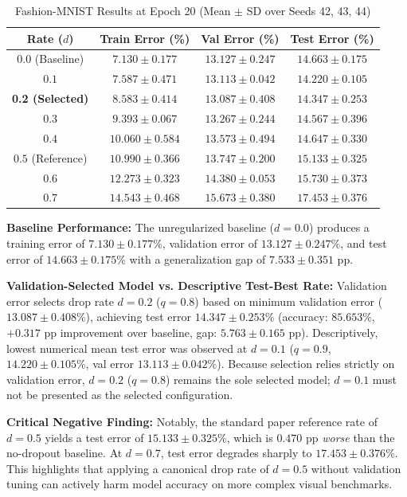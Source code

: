 \documentclass[conference]{IEEEtran}
\begin{document}
\begin{table}[htbp]
\caption{Fashion-MNIST Results at Epoch 20 (Mean $\pm$ SD over Seeds 42, 43, 44)}
\label{tab:fashion_summary}
\centering
\setlength{\tabcolsep}{2.2pt}
\begin{tabular}{cccc}
\toprule
\textbf{Rate ($d$)} & \textbf{Train Error (\%)} & \textbf{Val Error (\%)} & \textbf{Test Error (\%)} \\
\midrule
$0.0$ (Baseline) & $7.130 \pm 0.177$ & $13.127 \pm 0.247$ & $14.663 \pm 0.175$ \\
$0.1$ & $7.587 \pm 0.471$ & $13.113 \pm 0.042$ & $14.220 \pm 0.105$ \\
\textbf{0.2 (Selected)} & $\mathbf{8.583 \pm 0.414}$ & $\mathbf{13.087 \pm 0.408}$ & $\mathbf{14.347 \pm 0.253}$ \\
$0.3$ & $9.393 \pm 0.067$ & $13.267 \pm 0.244$ & $14.567 \pm 0.396$ \\
$0.4$ & $10.060 \pm 0.584$ & $13.573 \pm 0.494$ & $14.647 \pm 0.330$ \\
$0.5$ (Reference) & $10.990 \pm 0.366$ & $13.747 \pm 0.200$ & $15.133 \pm 0.325$ \\
$0.6$ & $12.273 \pm 0.323$ & $14.380 \pm 0.053$ & $15.730 \pm 0.373$ \\
$0.7$ & $14.543 \pm 0.468$ & $15.673 \pm 0.380$ & $17.453 \pm 0.376$ \\
\bottomrule
\end{tabular}
\end{table}

\textbf{Baseline Performance:} The unregularized baseline ($d=0.0$) produces a training error of $7.130 \pm 0.177\%$, validation error of $13.127 \pm 0.247\%$, and test error of $14.663 \pm 0.175\%$ with a generalization gap of $7.533 \pm 0.351$ pp.

\textbf{Validation-Selected Model vs. Descriptive Test-Best Rate:} Validation error selects drop rate $d=0.2$ ($q=0.8$) based on minimum validation error ($13.087 \pm 0.408\%$), achieving test error $14.347 \pm 0.253\%$ (accuracy: $85.653\%$, $+0.317$ pp improvement over baseline, gap: $5.763 \pm 0.165$ pp). Descriptively, lowest numerical mean test error was observed at $d=0.1$ ($q=0.9$, $14.220 \pm 0.105\%$, val error $13.113 \pm 0.042\%$). Because selection relies strictly on validation error, $d=0.2$ ($q=0.8$) remains the sole selected model; $d=0.1$ must not be presented as the selected configuration.

\textbf{Critical Negative Finding:} Notably, the standard paper reference rate of $d=0.5$ yields a test error of $15.133 \pm 0.325\%$, which is $0.470$ pp \emph{worse} than the no-dropout baseline. At $d=0.7$, test error degrades sharply to $17.453 \pm 0.376\%$. This highlights that applying a canonical drop rate of $d=0.5$ without validation tuning can actively harm model accuracy on more complex visual benchmarks.
\end{document}
